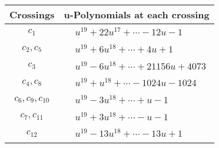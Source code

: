 \documentclass[1p]{elsarticle_modified}
\theoremstyle{definition}
\begin{document}
\begin{tabular}{m{50pt}|m{274pt}}
Crossings & \hspace{64pt}u-Polynomials at each crossing \\
\hline $$\begin{aligned}c_{1}\end{aligned}$$&$\begin{aligned}
&u^{19}+22 u^{17}+\cdots-12 u-1
\end{aligned}$\\
\hline $$\begin{aligned}c_{2},c_{5}\end{aligned}$$&$\begin{aligned}
&u^{19}+6 u^{18}+\cdots+4 u+1
\end{aligned}$\\
\hline $$\begin{aligned}c_{3}\end{aligned}$$&$\begin{aligned}
&u^{19}-6 u^{18}+\cdots+21156 u+4073
\end{aligned}$\\
\hline $$\begin{aligned}c_{4},c_{8}\end{aligned}$$&$\begin{aligned}
&u^{19}+u^{18}+\cdots-1024 u-1024
\end{aligned}$\\
\hline $$\begin{aligned}c_{6},c_{9},c_{10}\end{aligned}$$&$\begin{aligned}
&u^{19}-3 u^{18}+\cdots+u-1
\end{aligned}$\\
\hline $$\begin{aligned}c_{7},c_{11}\end{aligned}$$&$\begin{aligned}
&u^{19}+3 u^{18}+\cdots- u-1
\end{aligned}$\\
\hline $$\begin{aligned}c_{12}\end{aligned}$$&$\begin{aligned}
&u^{19}-13 u^{18}+\cdots-13 u+1
\end{aligned}$\\
\hline
\end{tabular}\\~\\
\newpage\renewcommand{\arraystretch}{1}
\end{document}
